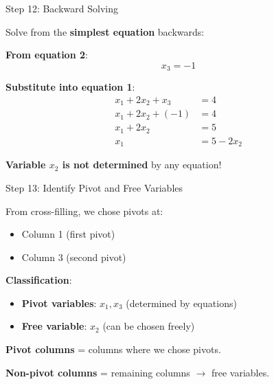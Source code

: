 \documentclass[10pt]{beamer}
\theoremstyle{definition}
\newcommand{\x}[1]{\alert{\textbf{#1}}}
\begin{document}
\begin{frame}{Step 12: Backward Solving}

Solve from the \x{simplest equation} backwards:

\vspace{1em}

\x{From equation 2}:
$$x_3 = -1$$

\vspace{1em}

\x{Substitute into equation 1}:
\begin{align*}
x_1 + 2x_2 + x_3 &= 4 \\
x_1 + 2x_2 + (-1) &= 4 \\
x_1 + 2x_2 &= 5 \\
x_1 &= 5 - 2x_2
\end{align*}

\vspace{1em}

\x{Variable $x_2$ is not determined} by any equation!

\end{frame}

\begin{frame}{Step 13: Identify Pivot and Free Variables}

From cross-filling, we chose pivots at:
\begin{itemize}
\item Column 1 (first pivot)
\item Column 3 (second pivot)
\end{itemize}

\vspace{1em}

\x{Classification}:
\begin{itemize}
\item \x{Pivot variables}: $x_1, x_3$ (determined by equations)
\item \x{Free variable}: $x_2$ (can be chosen freely)
\end{itemize}

\vspace{1em}

\x{Pivot columns} = columns where we chose pivots.

\x{Non-pivot columns} = remaining columns $\to$ free variables.

\end{frame}
\end{document}
